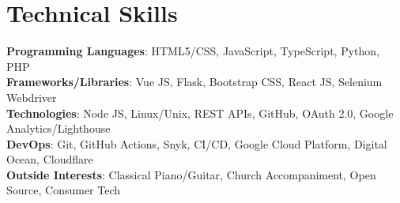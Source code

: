\section{Technical Skills}
 \begin{itemize}[leftmargin=0.15in, label={}]
    \small{\item{
     \textbf{Programming Languages}{: HTML5/CSS, JavaScript, TypeScript, Python, PHP} \\
     \textbf{Frameworks/Libraries}{: Vue JS, Flask, Bootstrap CSS, React JS, Selenium Webdriver} \\
     \textbf{Technologies}{: Node JS, Linux/Unix, REST APIs, GitHub, OAuth 2.0, Google Analytics/Lighthouse } \\
     \textbf{DevOps}{: Git, GitHub Actions, Snyk, CI/CD, Google Cloud Platform, Digital Ocean, Cloudflare } \\
     \textbf{Outside Interests}{: Classical Piano/Guitar, Church Accompaniment, Open Source, Consumer Tech}
    }}
 \end{itemize} 